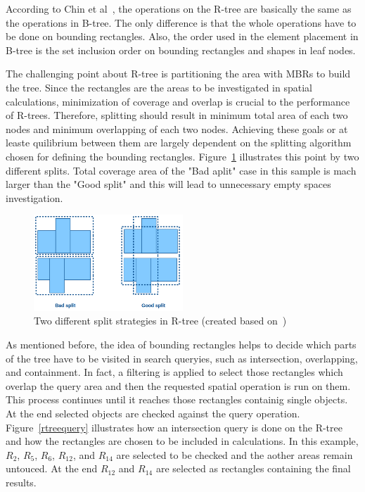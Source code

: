 \documentclass[a4paper,12pt]{article}
\begin{document}
According to Chin et al~\cite{survey}, the operations on the R-tree 
are basically the same as the operations in B-tree. The only difference is that the 
whole operations have to be done on bounding rectangles.
Also, the order used in the element placement in B-tree
is the set inclusion order on bounding rectangles and shapes in leaf nodes. 

The challenging point about R-tree is partitioning the area with MBRs to build the tree. Since the rectangles are the areas to be investigated in spatial calculations, minimization of coverage and overlap is crucial to the performance of R-trees. Therefore, splitting should result in minimum total area of each two nodes and minimum overlapping of each two nodes. Achieving these goals or at leaste quilibrium between them are largely dependent on the splitting algorithm chosen for defining the bounding rectangles. Figure~\ref{rtreesplit} illustrates this point by two different splits. Total coverage area of the "Bad aplit" case in this sample is mach larger than the "Good split" and this will lead to unnecessary empty spaces investigation.

\begin{figure}
\centering
\includegraphics[width=0.5\textwidth,height=0.17\textheight]{R-treeMBR}
\caption{Two different split strategies in R-tree (created based on~\cite{rtree})}
\label{rtreesplit}
\end{figure}

As mentioned before, the idea of bounding rectangles helps to decide which parts of the tree have to be visited in search queryies, such as intersection, overlapping, and containment. In fact, a filtering is applied to select those rectangles which overlap the query area and then the requested spatial operation is run on them. This process continues until it reaches those rectangles containig single objects. At the end selected objects are checked against the query operation. Figure~\ref{rtreequery} illustrates how an intersection query is done on the R-tree and how the rectangles are chosen to be included in calculations. In this example, \textit{$R_2$}, \textit{$R_5$}, \textit{$R_6$}, \textit{$R_{12}$}, and \textit{$R_{14}$} are selected to be checked and the aother areas remain untouced. At the end \textit{$R_{12}$} and \textit{$R_{14}$} are selected as rectangles containing the final results.
\end{document}
